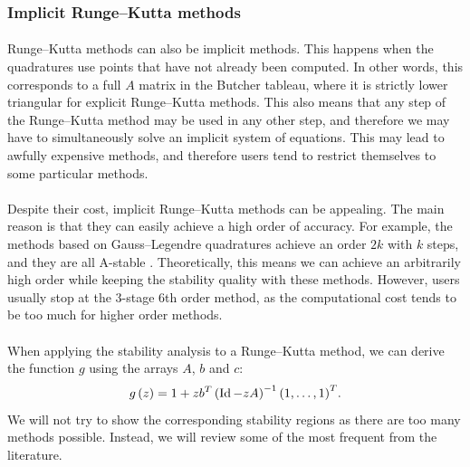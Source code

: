       \subsubsection{Implicit Runge--Kutta methods}

        \paragraph{}
        Runge--Kutta methods can also be implicit methods.
        This happens when the quadratures use points that have not already been computed.
        In other words, this corresponds to a full $A$ matrix in the Butcher tableau, where it is strictly lower triangular for explicit Runge--Kutta methods.
        This also means that any step of the Runge--Kutta method may be used in any other step, and therefore we may have to simultaneously solve an implicit system of equations.
        This may lead to awfully expensive methods, and therefore users tend to restrict themselves to some particular methods.

        \paragraph{}
        Despite their cost, implicit Runge--Kutta methods can be appealing.
        The main reason is that they can easily achieve a high order of accuracy.
        For example, the methods based on Gauss--Legendre quadratures achieve an order $2k$ with $k$ steps, and they are all A-stable \cite{Iserles2008}.
        Theoretically, this means we can achieve an arbitrarily high order while keeping the stability quality with these methods.
        However, users usually stop at the 3-stage 6th order method, as the computational cost tends to be too much for higher order methods.

        \paragraph{}
        When applying the stability analysis to a Runge--Kutta method, we can derive the function $g$ using the arrays $A$, $b$ and $c$:
        \begin{equation}
          g\left(z\right) = 1 + z {b}^T \left(\operatorname{Id} - zA\right)^{-1} {\left(1, \dots, 1\right)}^T .
        \end{equation}
        We will not try to show the corresponding stability regions as there are too many methods possible.
        Instead, we will review some of the most frequent from the literature.

